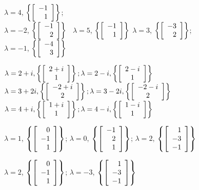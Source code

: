 
\begin{enumerate}[!HW!, start=1]
\begin{multicols}{3}
\itemspade $\lambda = 4$, $\left\{\vr{-1\\1}\right\}$;\\ $\lambda = -2$, $\left\{\vr{-1\\2}\right\}$\ %
\itemspade $\lambda = 5$, $\left\{\vr{-1\\1}\right\}$ %
\itemspade $\lambda = 3$, $\left\{\vr{-3\\2}\right\}$;\\ $\lambda = -1$, $\left\{\vr{-4\\3}\right\}$\ %
\end{multicols}
\begin{multicols}{3}
\itemspade $\lambda = 2+i, \left\{\mtx{c}{2+i\\1}\right\};\\ \lambda = 2-i, \left\{\mtx{c}{2-i\\1}\right\}$ %
\itemspade $\lambda = 3+2i, \left\{\mtx{c}{-2+i\\2}\right\};\\ \lambda = 3-2i, \left\{\mtx{c}{-2-i\\2}\right\}$ %
\itemspade $\lambda = 4+i, \left\{\mtx{c}{1+i\\1}\right\};\\ \lambda = 4-i, \left\{\mtx{c}{1-i\\1}\right\}$ %
\end{multicols}
\itemspade $\lambda = 1$, $\left\{\vr{0\\-1\\1}\right\}$; $\lambda=0$, $\left\{\vr{-1\\2\\1}\right\}$; $\lambda=2$, $\left\{\vr{1\\-3\\-1}\right\}$  %
\begin{multicols}{2}
\itemspade $\lambda = 2$, $\left\{\vr{0\\-1\\1}\right\}$; $\lambda=-3$, $\left\{\vr{1\\-3\\-1}\right\}$ %

\end{multicols}
\end{enumerate}
